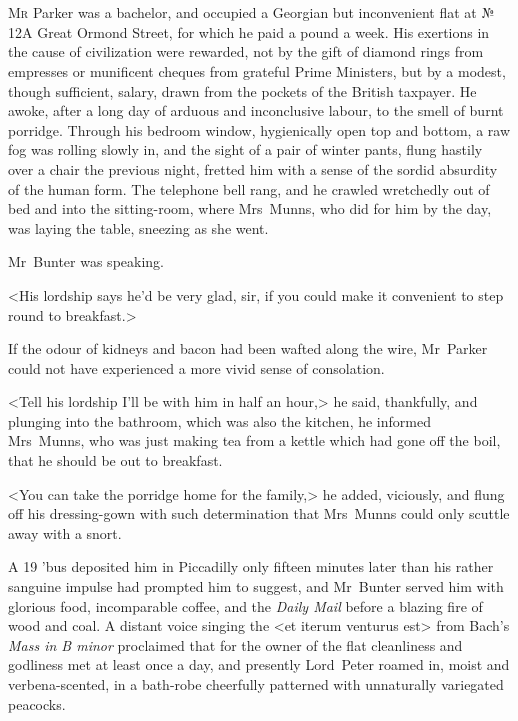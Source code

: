 \chapter[Chapter \thechapter]{}
\lettrine[lines=4]{M}{r} Parker was a bachelor, and occupied a Georgian but inconvenient flat at № 12A Great Ormond Street, for which he paid a pound a week. His exertions in the cause of civilization were rewarded, not by the gift of diamond rings from empresses or munificent cheques from grateful Prime Ministers, but by a modest, though sufficient, salary, drawn from the pockets of the British taxpayer. He awoke, after a long day of arduous and inconclusive labour, to the smell of burnt porridge. Through his bedroom window, hygienically open top and bottom, a raw fog was rolling slowly in, and the sight of a pair of winter pants, flung hastily over a chair the previous night, fretted him with a sense of the sordid absurdity of the human form. The telephone bell rang, and he crawled wretchedly out of bed and into the sitting-room, where Mrs~Munns, who did for him by the day, was laying the table, sneezing as she went.

Mr~Bunter was speaking.

<His lordship says he'd be very glad, sir, if you could make it convenient to step round to breakfast.>

If the odour of kidneys and bacon had been wafted along the wire, Mr~Parker could not have experienced a more vivid sense of consolation.

<Tell his lordship I'll be with him in half an hour,> he said, thankfully, and plunging into the bathroom, which was also the kitchen, he informed Mrs~Munns, who was just making tea from a kettle which had gone off the boil, that he should be out to breakfast.

<You can take the porridge home for the family,> he added, viciously, and flung off his dressing-gown with such determination that Mrs~Munns could only scuttle away with a snort.

A 19 'bus deposited him in Piccadilly only fifteen minutes later than his rather sanguine impulse had prompted him to suggest, and Mr~Bunter served him with glorious food, incomparable coffee, and the \textit{Daily Mail} before a blazing fire of wood and coal. A distant voice singing the <et iterum venturus est> from Bach's \textit{Mass in B minor} proclaimed that for the owner of the flat cleanliness and godliness met at least once a day, and presently Lord~Peter roamed in, moist and verbena-scented, in a bath-robe cheerfully patterned with unnaturally variegated peacocks.

